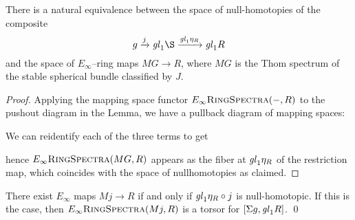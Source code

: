 \begin{corollary}
There is a natural equivalence between the space of null-homotopies of the composite \[g \xrightarrow j \gl_1 \S \xrightarrow{\gl_1 \eta_R} \gl_1 R\] and the space of $E_\infty$--ring maps $MG \to R$, where $MG$ is the Thom spectrum of the stable spherical bundle classified by $J$.
\end{corollary}
\begin{proof}
Applying the mapping space functor $E_\infty\normalfont\textsc{RingSpectra}(-, R)$ to the pushout diagram in the Lemma, we have a pullback diagram of mapping spaces:
\begin{center}
\end{center}
We can reidentify each of the three terms to get
\begin{center}
\end{center}
hence $E_\infty\normalfont\textsc{RingSpectra}(MG, R)$ appears as the fiber at $\mathit{gl}_1 \eta_R$ of the restriction map, which coincides with the space of nullhomotopies as claimed.
\end{proof}

\begin{corollary}
There exist $E_\infty$ maps $Mj \to R$ if and only if $\mathit{gl}_1 \eta_R \circ j$ is null-homotopic.  If this is the case, then $E_\infty\normalfont\textsc{RingSpectra}(Mj, R)$ is a torsor for $[\Sigma g, \mathit{gl}_1 R]$. \qed
\end{corollary}


